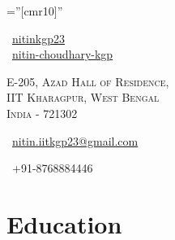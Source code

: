 \documentclass[a4paper,10pt]{extarticle} %
\begin{document}
\pagestyle{empty} %

\font\fb=''[cmr10]'' %

\begin{multicols}{3}
\normalsize \faGithub\ {\href{https://github.com/nitinkgp23}{nitinkgp23}}\\
\normalsize  \faLinkedinSquare\ {\href{https://www.linkedin.com/in/nitin-choudhary-kgp}{nitin-choudhary-kgp}}\\
\columnbreak
\normalsize\par{\par} %
\par{\centering\normalsize {\textsc{E-205, Azad Hall of Residence, \\ IIT Kharagpur, West Bengal\\ India - 721302}}\hfill\par}
\columnbreak
\raggedright\hfill\normalsize \faEnvelope\ {\href{mailto:nitin.iitkgp23@gmail.com}{nitin.iitkgp23@gmail.com}}\\
\raggedright\hfill{\faPhone\ +91-8768884446}
\end{multicols}


\vspace{-0.6cm}
\section{Education}
\end{document}
